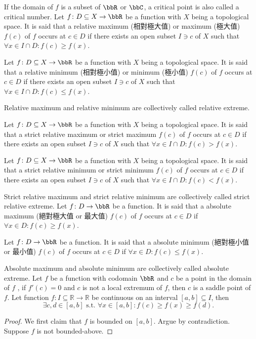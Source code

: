 \documentclass[a4paper,12pt]{report}
\begin{document}
\begin{itemize}
\begin{itemize}
If the domain of $f$ is a subset of $\bbR$ or $\bbC$, a critical point is also called a critical number.
Let $f\colon D\subseteq X\to\bbR$ be a function with $X$ being a topological space. It is said that a relative maximum (相對極大值) or maximum (極大值) \( f(c) \) of \(f\) occurs at $c\in D$ if there exists an open subset $I\ni c$ of $X$ such that \( \forall x\in I\cap D\colon f(c) \geq f(x) \).

Let $f\colon D\subseteq X\to\bbR$ be a function with $X$ being a topological space. It is said that a relative minimum (相對極小值) or minimum (極小值) \( f(c) \) of \(f\) occurs at $c\in D$ if there exists an open subset $I\ni c$ of $X$ such that \( \forall x\in I\cap D\colon f(c) \leq f(x) \).

Relative maximum and relative minimum are collectively called relative extreme.

Let $f\colon D\subseteq X\to\bbR$ be a function with $X$ being a topological space. It is said that a strict relative maximum or strict maximum \( f(c) \) of \(f\) occurs at $c\in D$ if there exists an open subset $I\ni c$ of $X$ such that \( \forall x\in I\cap D\colon f(c) > f(x) \).

Let $f\colon D\subseteq X\to\bbR$ be a function with $X$ being a topological space. It is said that a strict relative minimum or strict minimum \( f(c) \) of \(f\) occurs at $c\in D$ if there exists an open subset $I\ni c$ of $X$ such that \( \forall x\in I\cap D\colon f(c) < f(x) \).

Strict relative maximum and strict relative minimum are collectively called strict relative extreme.
Let $f\colon D\to\bbR$ be a function. It is said that a absolute maximum (絕對極大值 or 最大值) \( f(c) \) of \(f\) occurs at $c\in D$ if \( \forall x\in D\colon f(c) \geq f(x) \).

Let $f\colon D\to\bbR$ be a function. It is said that a absolute minimum (絕對極小值 or 最小值) \( f(c) \) of \(f\) occurs at $c\in D$ if \( \forall x\in D\colon f(c) \leq f(x) \).

Absolute maximum and absolute minimum are collectively called absolute extreme.
Let $f$ be a function with codomain $\bbR$ and \( c \) be a point in the domain of $f$ , if \( f'(c) = 0 \) and $c$ is not a local extremum of $f$, then $c$ is a saddle point of $f$.
Let function $f\colon I\subseteq\mathbb{R}\to\mathbb{R}$ be continuous on an interval $[a,b]\subseteq I$, then
\[\exists c,d \in [a, b] \text{\ s.t.\ }\forall x \in [a, b]\colon f(c)\geq f(x)\geq f(d).\]
\begin{proof}
We first claim that $f$ is bounded on $[a,b]$. Argue by contradiction. Suppose $f$ is not bounded-above.


\end{proof}
\end{itemize}
\end{itemize}
\end{document}
